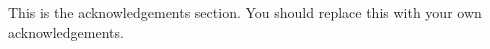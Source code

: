 \documentclass[12pt,twoside]{mitthesis}
\begin{document}
This is the acknowledgements section.  You should replace this with your
own acknowledgements.

\pagestyle{plain}


\begin{singlespace}
\tableofcontents
\newpage
\listoffigures
\newpage
\listoftables
\end{singlespace}








\appendix


\begin{singlespace}


\end{singlespace}
\end{document}
